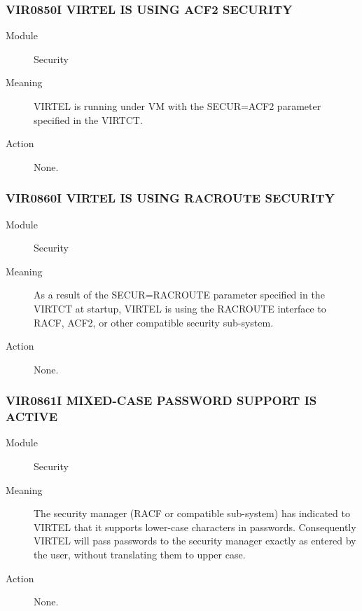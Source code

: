 \documentclass[letterpaper,10pt,english]{sphinxmanual}
\begin{document}
\subsubsection{VIR0850I VIRTEL IS USING ACF2 SECURITY}
\label{\detokenize{messages:vir0850i-virtel-is-using-acf2-security}}\begin{description}
\item[{Module}] \leavevmode
Security

\item[{Meaning}] \leavevmode
VIRTEL is running under VM with the SECUR=ACF2 parameter specified in the VIRTCT.

\item[{Action}] \leavevmode
None.

\end{description}


\subsubsection{VIR0860I VIRTEL IS USING RACROUTE SECURITY}
\label{\detokenize{messages:vir0860i-virtel-is-using-racroute-security}}\begin{description}
\item[{Module}] \leavevmode
Security

\item[{Meaning}] \leavevmode
As a result of the SECUR=RACROUTE parameter specified in the VIRTCT at startup, VIRTEL is using the RACROUTE interface to RACF, ACF2, or other compatible security sub-system.

\item[{Action}] \leavevmode
None.

\end{description}


\subsubsection{VIR0861I MIXED-CASE PASSWORD SUPPORT IS ACTIVE}
\label{\detokenize{messages:vir0861i-mixed-case-password-support-is-active}}\begin{description}
\item[{Module}] \leavevmode
Security

\item[{Meaning}] \leavevmode
The security manager (RACF or compatible sub-system) has indicated to VIRTEL that it supports lower-case characters in passwords. Consequently VIRTEL will pass passwords to the security manager exactly as entered by the user, without translating them to upper case.

\item[{Action}] \leavevmode
None.

\end{description}
\end{document}
